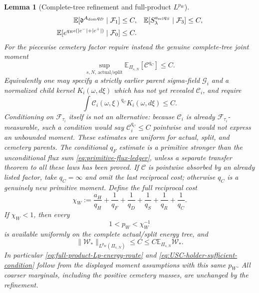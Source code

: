 \documentclass[11pt]{article}
\newtheorem{lemma}[theorem]{Lemma}
\begin{document}
\begin{lemma}[Complete-tree refinement and full-product $L^{p_W}$]
\begin{align}
 \mathbb E[\mathfrak d^{A_{\rm dom}q_D}\mid\mathcal F_1]&\le C,&
 \mathbb E[S_\lambda^{a_{\rm scl}q_S}\mid\mathcal F_3]&\le C,
 \notag\\
 \mathbb E[e^{q_R\epsilon(|c^-|+|c^+|)}\mid\mathcal F_0]&\le C.
 \notag
\end{align}
For the piecewise cemetery factor require instead the genuine complete-tree
joint moment
\begin{equation}
\label{eq:complete-tree-cemetery-moment}
 \sup_{s,N,\,\mathrm{actual/split}}
 \mathbb E_{\Pi_{s,N}}[\mathcal C^{q_C}]\le C.
\end{equation}
Equivalently one may specify a strictly earlier parent sigma-field
$\mathcal G_i$ and a normalized child kernel $K_i(\omega,d\xi)$ which has not
yet revealed $\mathcal C_i$, and require
\begin{equation}
\label{eq:parent-kernel-cemetery-moment}
 \int \mathcal C_i(\omega,\xi)^{q_C}K_i(\omega,d\xi)\le C.
\end{equation}
Conditioning on $\mathcal F_{\tau_i}$ itself is not an alternative: because
$\mathcal C_i$ is already $\mathcal F_{\tau_i}$-measurable, such a condition
would say $\mathcal C_i^{q_C}\le C$ pointwise and would not express an
unbounded moment.  These estimates are uniform for actual, split, and
cemetery parents.  The conditional
$q_F$ estimate is a primitive stronger than the unconditional flux sum
\eqref{eq:primitive-flux-ledger}, unless a separate transfer theorem to all
these laws has been proved.  If $\mathcal C$ is pointwise absorbed by an
already listed factor, take $q_C=\infty$ and omit the last reciprocal cost;
otherwise $q_C$ is a genuinely new primitive moment.
Define the full reciprocal cost
\begin{equation}
\label{eq:full-product-reciprocal-cost}
 \chi_W:=\frac{a_H}{q_H}+\frac1{q_F}+\frac1{q_D}
       +\frac1{q_S}+\frac1{q_R}+\frac1{q_C}.
\end{equation}
If $\chi_W<1$, then every
\begin{equation}
\label{eq:available-full-product-pW}
 1<p_W<\chi_W^{-1}
\end{equation}
is available uniformly on the complete actual/split energy tree, and
\begin{equation}
\label{eq:proved-full-product-Lp}
 \|\mathscr W_*\|_{L^{p_W}(\Pi_{s,N})}
 \le C\le C\mathbb E_{\Pi_{s,N}}\mathscr W_*.
\end{equation}
In particular \eqref{eq:full-product-Lp-energy-route} and
\eqref{eq:USC-holder-sufficient-condition} follow from the displayed
moment assumptions with this same $p_W$.  All coarser marginals, including
the positive cemetery masses, are unchanged by the refinement.
\end{lemma}
\end{document}
